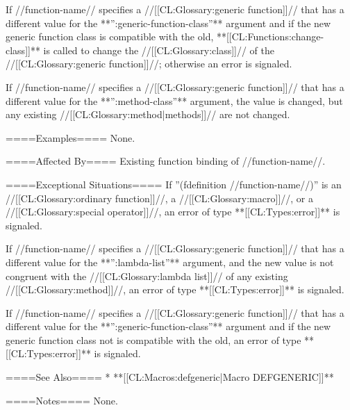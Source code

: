 If //function-name// specifies a //[[CL:Glossary:generic function]]// that has a different value for the **'':generic-function-class''** argument and if the new generic function class is compatible with the old, **[[CL:Functions:change-class]]** is called to change the //[[CL:Glossary:class]]// of the //[[CL:Glossary:generic function]]//; otherwise an error is signaled.

If //function-name// specifies a //[[CL:Glossary:generic function]]// that has a different value for the **'':method-class''** argument, the value is changed, but any existing //[[CL:Glossary:method|methods]]// are not changed.

====Examples====
None.

====Affected By====
Existing function binding of //function-name//.

====Exceptional Situations====
If ''(fdefinition //function-name//)'' is an //[[CL:Glossary:ordinary function]]//, a //[[CL:Glossary:macro]]//, or a //[[CL:Glossary:special operator]]//, an error of type **[[CL:Types:error]]** is signaled.

If //function-name// specifies a //[[CL:Glossary:generic function]]// that has a different value for the **'':lambda-list''** argument, and the new value is not congruent with the //[[CL:Glossary:lambda list]]// of any existing //[[CL:Glossary:method]]//, an error of type **[[CL:Types:error]]** is signaled.

If //function-name// specifies a //[[CL:Glossary:generic function]]// that has a different value for the **'':generic-function-class''** argument and if the new generic function class not is compatible with the old, an error of type **[[CL:Types:error]]** is signaled.

====See Also====
  * **[[CL:Macros:defgeneric|Macro DEFGENERIC]]**

====Notes====
None.

 
